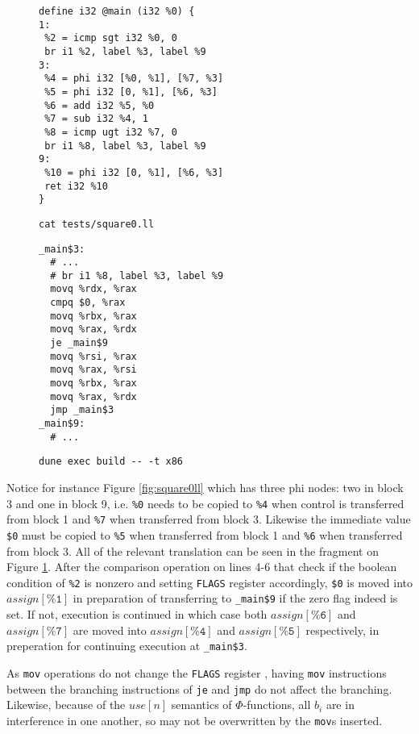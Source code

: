 \documentclass{article}
\begin{document}
\begin{figure}[H]
   \begin{minipage}{0.48\textwidth}
     \centering
     \begin{verbatim}
define i32 @main (i32 %0) {
1:
 %2 = icmp sgt i32 %0, 0
 br i1 %2, label %3, label %9
3:
 %4 = phi i32 [%0, %1], [%7, %3]
 %5 = phi i32 [0, %1], [%6, %3]
 %6 = add i32 %5, %0
 %7 = sub i32 %4, 1
 %8 = icmp ugt i32 %7, 0
 br i1 %8, label %3, label %9
9:
 %10 = phi i32 [0, %1], [%6, %3]
 ret i32 %10
}
     \end{verbatim}
     \caption{\texttt{cat tests/square0.ll}}\label{fig:square0ll}
   \end{minipage}\hfill
   \begin{minipage}{0.48\textwidth}
     \centering
     \begin{verbatim}
_main$3:
  # ...
  # br i1 %8, label %3, label %9
  movq %rdx, %rax
  cmpq $0, %rax
  movq %rbx, %rax
  movq %rax, %rdx
  je _main$9
  movq %rsi, %rax
  movq %rax, %rsi
  movq %rbx, %rax
  movq %rax, %rdx
  jmp _main$3
_main$9:
  # ...
     \end{verbatim}
     \caption{\texttt{dune exec build -{}- -t x86}}\label{fig:square0s}
   \end{minipage}
\end{figure}

\noindent Notice for instance Figure \ref{fig:square0ll} which has three phi nodes: two in  block 3 and one in block 9, i.e. \texttt{\%0} needs to be copied to \texttt{\%4} when control is transferred from block 1 and \texttt{\%7} when transferred from block 3. Likewise the immediate value \texttt{\$0} must be copied to \texttt{\%5} when transferred from block 1 and \texttt{\%6} when transferred from block 3.
All of the relevant translation can be seen in the fragment on Figure \ref{fig:square0s}. After the comparison operation on lines 4-6 that check if the boolean condition of \texttt{\%2} is nonzero and setting \texttt{FLAGS} register accordingly, \texttt{\$0} is moved into
\(\mathit{assign}[\texttt{\%1}]\) in preparation
of transferring to \texttt{\_main\$9} if the zero flag indeed is set. If not, execution is continued in which case both \(\mathit{assign}[\texttt{\%6}]\) and \(\mathit{assign}[\texttt{\%7}]\) are moved into \(\mathit{assign}[\texttt{\%4}]\) and \(\mathit{assign}[\texttt{\%5}]\) respectively, in preperation for continuing execution at \texttt{\_main\$3}.

As \texttt{mov} operations do not change the \texttt{FLAGS} register \cite{x86asm}, having \texttt{mov} instructions between the branching instructions of \texttt{je} and \texttt{jmp} do not affect the branching. Likewise, because of the \(\mathit{use}[n]\) semantics of \(\Phi\)-functions, all \(b_i\) are in interference in one another, so may not be overwritten by the \texttt{mov}s inserted.
\end{document}
